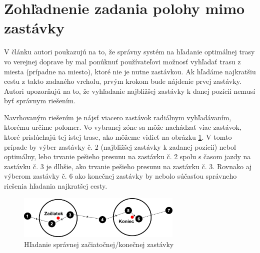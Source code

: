 %
%

\section{Zohľadnenie zadania polohy mimo zastávky}
\label{sec:actual-location}
V článku \cite{circular} autori poukazujú na to, že správny systém na hľadanie optimálnej trasy vo verejnej doprave by mal ponúknuť používateľovi možnosť vyhľadať trasu z miesta (prípadne na miesto), ktoré nie je nutne zastávkou. Ak hľadáme najkratšiu cestu z takto zadaného vrcholu, prvým krokom bude nájdenie prvej zastávky. Autori upozorňujú na to, že vyhľadanie najbližšej zastávky k danej pozícii nemusí byť správnym riešením.

Navrhovaným riešením je nájsť viacero zastávok radiálnym vyhľadávaním, ktorému určíme polomer. Vo vybranej zóne sa môže nachádzať viac zastávok, ktoré prislúchajú tej istej trase, ako môžeme vidieť na obrázku \ref{fig:circularRoute}. V tomto prípade by výber zastávky č. 2 (najbližšej zastávky k zadanej pozícii) nebol optimálny, lebo trvanie pešieho presunu na zastávku č. 2 spolu s časom jazdy na zastávku č. 3 je dlhšie, ako trvanie pešieho presunu na zastávku č. 3. Rovnako aj výberom zastávky č. 6 ako konečnej zastávky by nebolo súčasťou správneho riešenia hľadania najkratšej cesty. 

\begin{figure}[H]
\centerline{\includegraphics[width=0.7\textwidth]{images/circular-route}}
\caption[Hľadanie správnej začiatočnej/konečnej zastávky]{Hľadanie správnej začiatočnej/konečnej zastávky}
\label{fig:circularRoute}
\end{figure}

